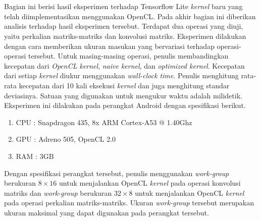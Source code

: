 \chapter{\babLima}
Bagian ini berisi hasil eksperimen terhadap Tensorflow Lite \textit{kernel} baru yang telah diimplementasikan menggunakan OpenCL. Pada akhir bagian ini diberikan analisis terhadap hasil eksperimen tersebut. Terdapat dua operasi yang diuji, yaitu perkalian matriks-matriks dan konvolusi matriks. Eksperimen dilakukan dengan cara memberikan ukuran masukan yang bervariasi terhadap operasi-operasi tersebut. Untuk masing-masing operasi, penulis membandingkan kecepatan dari \textit{OpenCL kernel}, \textit{naive kernel}, dan \textit{optimized kernel}. Kecepatan dari setiap \textit{kernel} diukur menggunakan \textit{wall-clock time}. Penulis menghitung rata-rata kecepatan dari 10 kali eksekusi \textit{kernel} dan juga menghitung standar deviasinya. Satuan yang digunakan untuk mengukur waktu adalah milidetik. Eksperimen ini dilakukan pada perangkat Android dengan spesifikasi berikut.

\begin{enumerate}
	\item CPU : Snapdragon 435, 8x ARM Cortex-A53 @ 1.40Ghz
	\item GPU : Adreno 505, OpenCL 2.0
	\item RAM : 3GB
\end{enumerate}

Dengan spesifikasi perangkat tersebut, penulis menggunakan \textit{work-group} berukuran $8 \times 16$ untuk menjalankan OpenCL \textit{kernel} pada operasi konvolusi matriks dan \textit{work-group} berukuran $32 \times 8$ untuk menjalankan OpenCL \textit{kernel} pada operasi perkalian matriks-matriks. Ukuran \textit{work-group} tersebut merupakan ukuran maksimal yang dapat digunakan pada perangkat tersebut.

